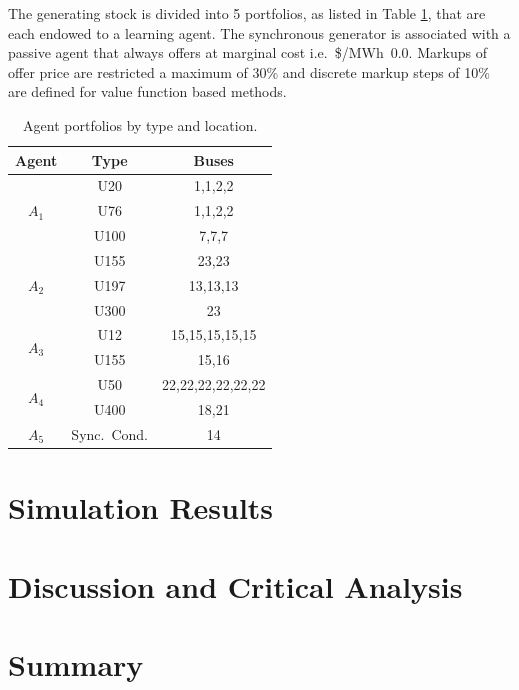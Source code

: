 The generating stock is divided into 5 portfolios, as listed in Table
\ref{tbl:agent_portfolios}, that are each endowed to a learning agent.  The
synchronous generator is associated with a passive agent that always offers at
marginal cost i.e.~\$/MWh~$0.0$. Markups of offer price are restricted a
maximum of 30\% and discrete markup steps of 10\% are defined for value
function based methods.

\begin{table}
\begin{center}
\begin{tabular}{c|c|c}
\hline
Agent &Type &\multicolumn{1}{c}{Buses} \\
\hline\hline
\multirow{3}{*}{$A_1$} &U20 &1,1,2,2 \\
 & U76 &1,1,2,2 \\
 & U100 &7,7,7\\
\hline
\multirow{3}{*}{$A_2$} &U155 &23,23 \\
 & U197 &13,13,13 \\
 & U300 &23 \\
\hline
\multirow{2}{*}{$A_3$} &U12 &15,15,15,15,15 \\
 & U155 &15,16 \\
\hline
\multirow{2}{*}{$A_4$} &U50 &22,22,22,22,22,22 \\
 & U400 &18,21 \\
\hline
$A_5$ & Sync.~Cond. &14 \\
\hline
\end{tabular}
\caption{Agent portfolios by type and location.}
\label{tbl:agent_portfolios}
\end{center}
\end{table}

%

\section{Simulation Results}
\section{Discussion and Critical Analysis}
\label{sec:discuss}
\section{Summary}
